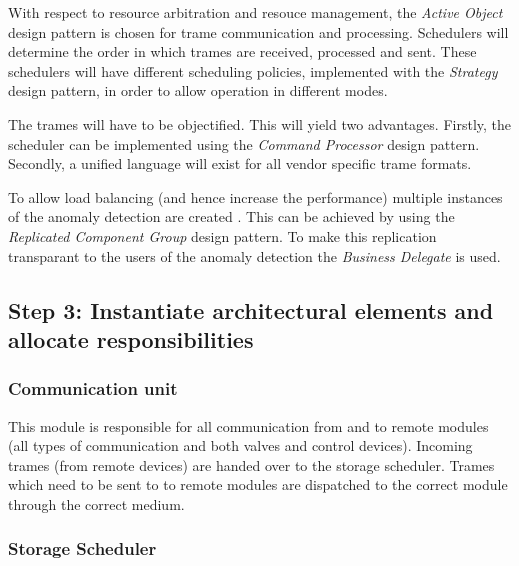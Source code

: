 \npar With respect to resource arbitration and resouce management, the
\emph{Active Object} design pattern is chosen for trame communication and
processing. Schedulers will determine the order in which trames are received,
processed and sent. These schedulers will have different scheduling policies,
implemented with the \emph{Strategy} design pattern, in order to allow operation
in different modes.

\npar The trames will have to be objectified. This will yield two advantages.
Firstly, the scheduler can be implemented using the \emph{Command Processor}
design pattern. Secondly, a unified language will exist for all vendor
specific trame formats.


\npar To allow load balancing (and hence increase the performance) multiple
instances of the anomaly detection are created . This can be achieved by using
the \emph{Replicated Component Group} design pattern. To make this replication
transparant to the users of the anomaly detection the \emph{Business Delegate}
is used.

\subsection{Step 3: Instantiate architectural elements and allocate responsibilities}
\label{add:it1/elements}


\subsubsection{Communication unit}

\npar This module is responsible for all communication from and to remote
modules (all types of communication and both valves and control devices).
Incoming trames (from remote devices) are handed over to the storage scheduler.
Trames which need to be sent to to remote modules are dispatched to the correct
module through the correct medium.

\subsubsection{Storage Scheduler}


